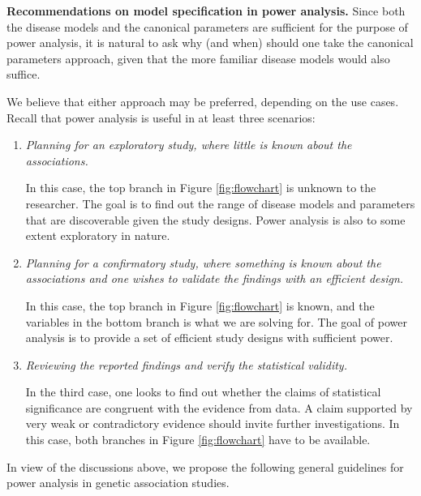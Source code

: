 \medskip\noindent
{\bf Recommendations on model specification in power analysis.}
Since both the disease models and the canonical parameters are sufficient for the purpose of power analysis, it is natural to ask why (and when) should one take the canonical parameters approach, given that the more familiar disease models would also suffice.

We believe that either approach may be preferred, depending on the use cases.
Recall that power analysis is useful in at least three scenarios:
\begin{enumerate}
    \item {\it Planning for an exploratory study, where little is known about the associations.}
    
    In this case, the top branch in Figure \ref{fig:flowchart} is unknown to the researcher.
    The goal is to find out the range of disease models and parameters that are discoverable given the study designs.
    Power analysis is also to some extent exploratory in nature.
    
    \item {\it Planning for a confirmatory study, where something is known about the associations and one wishes to validate the findings with an efficient design.}
    
    In this case, the top branch in Figure \ref{fig:flowchart} is known, and the variables in the bottom branch is what we are solving for.
    The goal of power analysis is to provide a set of efficient study designs with sufficient power.
    
    \item {\it Reviewing the reported findings and verify the statistical validity.}
    
    In the third case, one looks to find out whether the claims of statistical significance are congruent with the evidence from data.
    A claim supported by very weak or contradictory evidence should invite further investigations.
    In this case, both branches in Figure \ref{fig:flowchart} have to be available.
\end{enumerate}

In view of the discussions above, we propose the following general guidelines for power analysis in genetic association studies.

